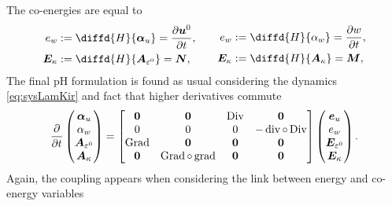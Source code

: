 The co-energies are equal to
\begin{equation}
\begin{aligned}
e_w &:= \diffd{H}{\bm\alpha_u} = \diffp{\bm{u}^0}{t},\\
\bm{E}_{\kappa} &:= \diffd{H}{\bm{A}_{\varepsilon^0}} = \bm{N},\\
\end{aligned} \qquad
\begin{aligned}
e_w &:= \diffd{H}{\alpha_w} = \diffp{w}{t}, \\
\bm{E}_{\kappa} &:= \diffd{H}{\bm{A}_{\kappa}} = \bm{M}, \\
\end{aligned} 
\end{equation}
The final pH formulation is found as usual considering the dynamics \eqref{eq:sysLamKir} and fact that higher derivatives commute
\begin{equation}\label{eq:phsysLamKir}
\diffp{}{t}
\begin{pmatrix}
\bm\alpha_u \\
\alpha_w \\
\bm{A}_{\varepsilon^0} \\
\bm{A}_\kappa \\
\end{pmatrix} = 
\begin{bmatrix}
\bm{0} & \bm{0} &  \Div & \bm{0} \\
0 & 0 & 0 & -\div\circ\Div \\
\Grad & \bm{0} & \bm{0}  & \bm{0} \\
\bm{0} & \Grad\circ\grad & \bm{0} & \bm{0} \\
\end{bmatrix}
\begin{pmatrix}
\bm{e}_u \\
e_w \\
\bm{E}_{\varepsilon^0} \\
\bm{E}_{\kappa} \\
\end{pmatrix}.
\end{equation}
Again, the coupling appears when considering the link between energy and co-energy variables
